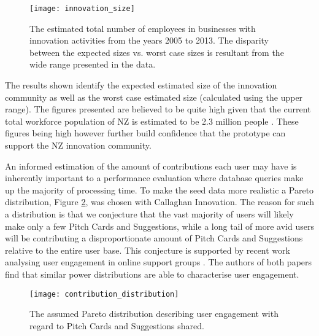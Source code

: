 \begin{figure}[ht]
    \centering
    \texttt{[image: innovation\_size]}
    \caption{The estimated total number of employees in businesses with innovation activities from the years 2005 to 2013. The disparity between the expected sizes vs. worst case sizes is resultant from the wide range presented in the data.}
    \label{fig:innovation_size}
\end{figure}

The results shown identify the expected estimated size of the innovation community as well as the worst case estimated size (calculated using the upper range). The figures presented are believed to be quite high given that the current total workforce population of NZ is estimated to be 2.3 million people \cite{WorkingPopulation:online}. These figures being high however further build confidence that the prototype can support the NZ innovation community.

An informed estimation of the amount of contributions each user may have is inherently important to a performance evaluation where database queries make up the majority of processing time. To make the seed data more realistic a Pareto distribution, Figure \ref{fig:contribution_distribution}, was chosen with Callaghan Innovation. The reason for such a distribution is that we conjecture that the vast majority of users will likely make only a few Pitch Cards and Suggestions, while a long tail of more avid users will be contributing a disproportionate amount of Pitch Cards and Suggestions relative to the entire user base. This conjecture is supported by recent work analysing user engagement in online support groups \cite{carron2014describing}\cite{van2015mapping}. The authors of both papers find that similar power distributions are able to characterise user engagement.

\begin{figure}[ht]
    \centering
    \texttt{[image: contribution\_distribution]}
    \caption{The assumed Pareto distribution describing user engagement with regard to Pitch Cards and Suggestions shared.}
    \label{fig:contribution_distribution}
\end{figure}

